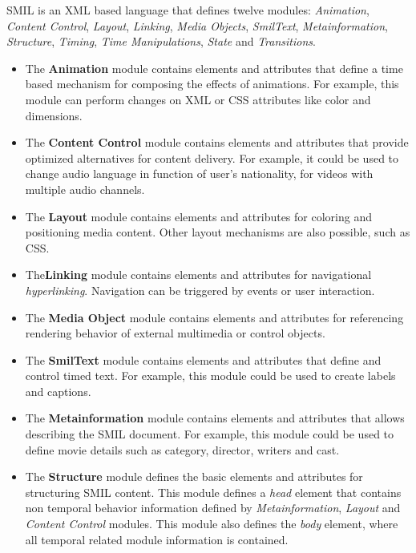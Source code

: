  \ac{SMIL} is an \ac{XML} based language that defines twelve modules: \emph{Animation}, \emph{Content Control}, \emph{Layout}, \emph{Linking}, \emph{Media Objects}, \emph{SmilText}, \emph{Metainformation}, \emph{Structure}, \emph{Timing}, \emph{Time Manipulations}, \emph{State} and \emph{Transitions}.


\begin{itemize}

  \item The \textbf{Animation} module contains elements and attributes that define a time based mechanism for composing the effects of animations. For example, this module can perform changes on \ac{XML} or \ac{CSS} attributes like color and dimensions.  

  \item The \textbf{Content Control} module contains elements and attributes that provide optimized alternatives for content delivery. For example, it could be used to change audio language in function of user's nationality, for videos with multiple audio channels.

  \item The \textbf{Layout} module contains elements and attributes for coloring and positioning media content. Other layout mechanisms are also possible, such as \ac{CSS}.

  \item The\textbf{Linking} module contains elements and attributes for navigational \emph{hyperlinking}. Navigation can be triggered by events or user interaction.

  \item The \textbf{Media Object} module contains elements and attributes for referencing rendering behavior of external multimedia or control objects.

  \item The \textbf{SmilText} module contains elements and attributes that define and control timed text. For example, this module could be used to create labels and captions.

  \item The \textbf{Metainformation} module contains elements and attributes that allows describing the \ac{SMIL} document. For example, this module could be used to define movie details such as category, director, writers and cast.

  \item The \textbf{Structure} module defines the basic elements and attributes for structuring \ac{SMIL} content. This module defines a \emph{head} element that contains non temporal behavior information defined by  \emph{Metainformation}, \emph{Layout} and \emph{Content Control} modules. This module also defines the \emph{body} element, where all temporal related module information is contained.


\end{itemize}
